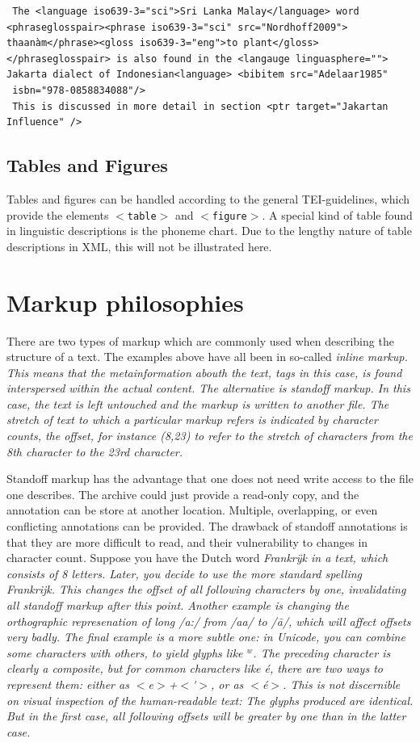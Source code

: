 \documentclass[a4paper,10pt]{article}
\newcommand{\teitag}[1]{\texttt{$<$#1$>$}}
\begin{document}
\begin{verbatim}
 The <language iso639-3="sci">Sri Lanka Malay</language> word 
<phraseglosspair><phrase iso639-3="sci" src="Nordhoff2009">
thaanàm</phrase><gloss iso639-3="eng">to plant</gloss>
</phraseglosspair> is also found in the <langauge linguasphere="">
Jakarta dialect of Indonesian<language> <bibitem src="Adelaar1985"
 isbn="978-0858834088"/>
 This is discussed in more detail in section <ptr target="Jakartan Influence" />
\end{verbatim}

\subsection{Tables and Figures}
Tables and figures can be handled according to the general TEI-guidelines, which provide the elements \teitag{table} and \teitag{figure}. A special kind of table found in linguistic descriptions is the phoneme chart. Due to the lengthy nature of table descriptions in XML, this will not be illustrated here.
 
\section{Markup philosophies}
There are two types of markup which are commonly used when describing the structure of a text. The examples above have all been in so-called \em inline \em markup. This means that the metainformation abouth the text, tags in this case, is found interspersed within the actual content. The alternative is standoff markup. In this case, the text is left untouched and the markup is written to another file. The stretch of text to which a particular markup refers is indicated by character counts, the offset, for instance (8,23) to refer to the stretch of characters from the 8th character to the 23rd character.

Standoff markup has the advantage that one does not need write access to the file one describes. The archive could just provide a read-only copy, and the annotation can be store at another location. Multiple, overlapping, or even conflicting annotations can be provided. The drawback of standoff annotations is that they are more difficult to read, and their vulnerability to changes in character count. Suppose you have the Dutch word \em Frankrÿk \em in a text, which consists of 8 letters. Later, you decide to use the more standard spelling \em Frankrijk\em. This changes the offset of all following characters by one, invalidating all standoff markup after this point. Another example is changing the orthographic represenation of long /a:/ from /aa/ to /\=a/, which will affect offsets very badly. The final example is a more subtle one: in Unicode, you can combine some characters with others, to yield glyphs like $^{w}$. The preceding character is clearly a composite, but for common characters like \em é\em, there are two ways to represent them: either as $<$e$>$+$<$\'{}$>$, or as $<$é$>$. This is not discernible on visual inspection of the human-readable text: The glyphs produced are identical. But in the first case, all following offsets will be greater by one than in the latter case.
\end{document}
